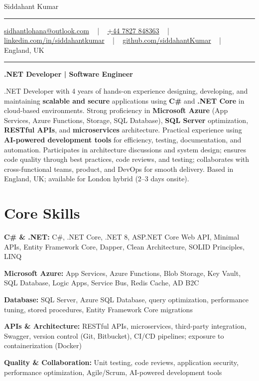 \documentclass[letterpaper,10pt]{article}
\newcommand{\documentTitle}[2]{
  \begin{center}
    \vspace*{-0.3in}
    {\Huge\color{accentTitle} #1}
    \vspace{8pt}
    {\color{accentLine} \hrule}
    \vspace{2pt}
    \footnotesize{#2}
    \vspace{2pt}
    {\color{accentLine} \hrule}
  \end{center}
}
\newenvironment{resume_list}{
  \vspace{-7pt}
  \begin{itemize}[itemsep=-2px, parsep=1pt, leftmargin=30pt]
}{
  \end{itemize}
}
\begin{document}
\documentTitle{Siddahant Kumar}{
\vspace{0.1cm}
\href{mailto:sidhantlohana@outlook.com}{sidhantlohana@outlook.com} ~ | ~
\href{tel:+447827848363}{+44 7827 848363} ~ | ~
\href{https://www.linkedin.com/in/siddahantkumar/}{linkedin.com/in/siddahantkumar} ~ | ~
\href{https://github.com/siddahantKumar}{github.com/siddahantKumar} ~ | ~
England, UK
}

\begin{center}
\textbf{.NET Developer | Software Engineer}
\end{center}

.NET Developer with 4 years of hands-on experience designing, developing, and maintaining \textbf{scalable and secure} applications using \textbf{C\#} and \textbf{.NET Core} in cloud-based environments. Strong proficiency in \textbf{Microsoft Azure} (App Services, Azure Functions, Storage, SQL Database), \textbf{SQL Server} optimization, \textbf{RESTful APIs}, and \textbf{microservices} architecture. Practical experience using \textbf{AI-powered development tools} for efficiency, testing, documentation, and automation. Participates in architecture discussions and system design; ensures code quality through best practices, code reviews, and testing; collaborates with cross-functional teams, product, and DevOps for smooth delivery. Based in England, UK; available for London hybrid (2--3 days onsite).


\section{Core Skills}

\begin{resume_list}
    \item \textbf{C\# \& .NET:} C\#, .NET Core, .NET 8, ASP.NET Core Web API, Minimal APIs, Entity Framework Core, Dapper, Clean Architecture, SOLID Principles, LINQ
    \item \textbf{Microsoft Azure:} App Services, Azure Functions, Blob Storage, Key Vault, SQL Database, Logic Apps, Service Bus, Redis Cache, AD B2C
    \item \textbf{Database:} SQL Server, Azure SQL Database, query optimization, performance tuning, stored procedures, Entity Framework Core migrations
    \item \textbf{APIs \& Architecture:} RESTful APIs, microservices, third-party integration, Swagger, version control (Git, Bitbucket), CI/CD pipelines; exposure to containerization (Docker)
    \item \textbf{Quality \& Collaboration:} Unit testing, code reviews, application security, performance optimization, Agile/Scrum, AI-powered development tools
\end{resume_list}
\end{document}
